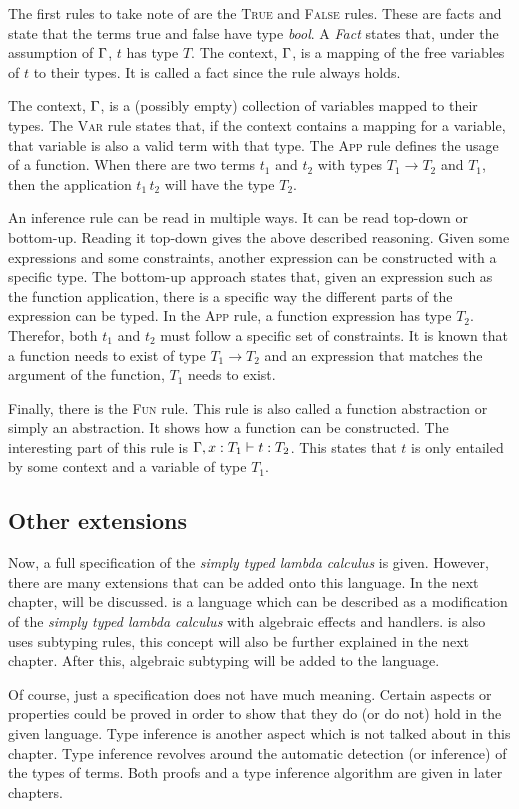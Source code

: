 The first rules to take note of are the \textsc{True} and \textsc{False} rules. These are facts and state that the terms true and false have type \textit{bool}. A \textit{Fact} states that, under the assumption of $\Gamma$, $t$ has type $T$. The context, $\Gamma$, is a mapping of the free variables of $t$ to their types. It is called a fact since the rule always holds.

The context, $\Gamma$, is a (possibly empty) collection of variables mapped to their types. The \textsc{Var} rule states that, if the context contains a mapping for a variable, that variable is also a valid term with that type. The \textsc{App} rule defines the usage of a function. When there are two terms $t_1$ and $t_2$ with types $T_1 \to T_2$ and $T_1$, then the application $t_1 \, t_2$ will have the type $T_2$.  

An inference rule can be read in multiple ways. It can be read top-down or bottom-up. Reading it top-down gives the above described reasoning. Given some expressions and some constraints, another expression can be constructed with a specific type. The bottom-up approach states that, given an expression such as the function application, there is a specific way the different parts of the expression can be typed. In the \textsc{App} rule, a function expression has type $T_2$. Therefor, both $t_1$ and $t_2$ must follow a specific set of constraints. It is known that a function needs to exist of type $T_1 \to T_2$ and an expression that matches the argument of the function, $T_1$ needs to exist. \cite{pierce2002types}

Finally, there is the \textsc{Fun} rule. This rule is also called a function abstraction or simply an abstraction. It shows how a function can be constructed. The interesting part of this rule is $\Gamma, x \mathrel{:} T_1 \vdash t \mathrel{:} T_2$. This states that $t$ is only entailed by some context and a variable of type $T_1$.

\subsection{Other extensions}

Now, a full specification of the \textit{simply typed lambda calculus} is given. However, there are many extensions that can be added onto this language. In the next chapter, \eff will be discussed. \eff is a language which can be described as a modification of the \textit{simply typed lambda calculus} with algebraic effects and handlers. \eff is also uses subtyping rules, this concept will also be further explained in the next chapter. After this, algebraic subtyping will be added to the language.

Of course, just a specification does not have much meaning. Certain aspects or properties could be proved in order to show that they do (or do not) hold in the given language. Type inference is another aspect which is not talked about in this chapter. Type inference revolves around the automatic detection (or inference) of the types of terms. Both proofs and a type inference algorithm are given in later chapters. 
